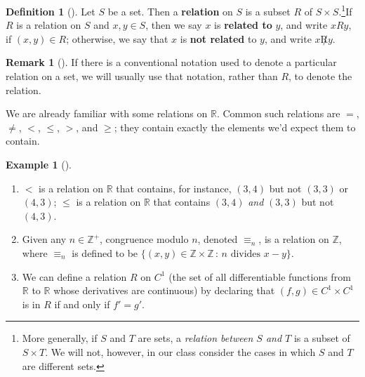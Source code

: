 \documentclass[10pt,]{book}
\newcommand{\terminology}[1]{\textbf{#1}}
\theoremstyle{plain}
\theoremstyle{definition}
\newtheorem{definition}[theorem]{Definition}
\theoremstyle{definition}
\newtheorem{remark}[theorem]{Remark}
\theoremstyle{definition}
\newtheorem{example}[theorem]{Example}
\theoremstyle{definition}
\numberwithin{equation}{section}
\def\Z{\mathbb{Z}}
\def\R{\mathbb{R}}
\newcommand{\lt}{<}
\begin{document}
\begin{definition}[{}]\label{definition-56}
Let \(S\) be a set. Then a \terminology{relation} on \(S\) is a subset \(R\) of \(S\times S\).\footnote{More generally, if \(S\) and \(T\) are sets, a \emph{relation between \(S\) and \(T\)} is a subset of \(S \times T\). We will not, however, in our class consider the cases in which \(S\) and \(T\) are different sets.\label{fn-5}}If \(R\) is a relation on \(S\) and \(x,y\in S\), then we say \(x\) is \terminology{related to} \(y\), and write \(x R y\), if \((x,y)\in R\); otherwise, we say that \(x\) is \terminology{not related} to \(y\), and write \(x \not R y\).%
\label{notation-31}
\label{notation-32}
\end{definition}
\begin{remark}[]\label{remark-33}
If there is a conventional notation used to denote a particular relation on a set, we will usually use that notation, rather than \(R\), to denote the relation.%
\end{remark}
We are already familiar with some relations on \(\R\). Common such relations are \(=\), \(\neq\), \(\lt\), \(\leq\), \(>\), and \(\geq\); they contain exactly the elements we'd expect them to contain.%
\begin{example}[]\label{example-64}
\leavevmode%
\begin{enumerate}
\item\hypertarget{li-390}{}\(\lt\) is a relation on \(\R\) that contains, for instance, \((3,4)\) but not \((3,3)\) or \((4,3)\); \(\leq\) is a relation on \(\R\) that contains \((3,4)\) \emph{and} \((3,3)\) but not \((4,3)\).%
\item\hypertarget{li-391}{}Given any \(n\in \Z^+\), congruence modulo \(n\), denoted \(\equiv_n\), is a relation on \(\Z\), where \(\equiv_n\) is defined to be \(\{(x,y) \in \Z
\times \Z \,:\, n \text{ divides } x-y\}\).%
\item\hypertarget{li-392}{}We can define a relation \(R\) on \(C^1\) (the set of all differentiable functions from \(\R\) to \(\R\) whose derivatives are continuous) by declaring that \((f,g)\in C^1 \times C^1\) is in \(R\) if and only if \(f'=g'\).%
\end{enumerate}
\end{example}
\end{document}
